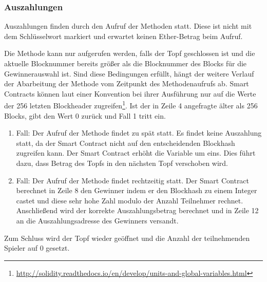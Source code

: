 \subsubsection{Auszahlungen}\label{sssec:eth_nbrOfMissedPayouts}
Auszahlungen finden durch den Aufruf der  Methoden statt. Diese ist nicht mit dem Schlüsselwort  markiert und erwartet keinen Ether-Betrag beim Aufruf.

Die Methode kann nur aufgerufen werden, falls der Topf geschlossen ist und die aktuelle Blocknummer bereits größer als die Blocknummer des Blocks für die Gewinnerauswahl ist. Sind diese Bedingungen erfüllt, hängt der weitere Verlauf der Abarbeitung der  Methode vom Zeitpunkt des Methodenaufrufs ab. Smart Contracts können laut einer Konvention bei ihrer Ausführung nur auf die Werte der 256 letzten Blockheader zugreifen\footnote{\url{http://solidity.readthedocs.io/en/develop/units-and-global-variables.html}}. Ist der in Zeile 4 angefragte  älter als 256 Blocks, gibt  den Wert 0 zurück und Fall 1 tritt ein.
\begin{enumerate}
\item Fall: Der Aufruf der  Methode findet zu spät statt. Es findet keine Auszahlung statt, da der Smart Contract nicht auf den entscheidenden Blockhash zugreifen kann. Der Smart Contract erhöht die  Variable um eins. Dies führt dazu, dass Betrag des Topfs in den nächsten Topf verschoben wird. 
\item Fall: Der Aufruf der  Methode findet rechtzeitig statt. Der Smart Contract berechnet in Zeile 8 den Gewinner indem er den Blockhash zu einem Integer castet und diese sehr hohe Zahl modulo der Anzahl Teilnehmer rechnet. Anschließend wird der korrekte Auszahlungsbetrag berechnet und in Zeile 12 an die Auszahlungsadresse des Gewinners versandt.
\end{enumerate}
Zum Schluss wird der Topf wieder geöffnet und die Anzahl der teilnehmenden Spieler auf 0 gesetzt.

